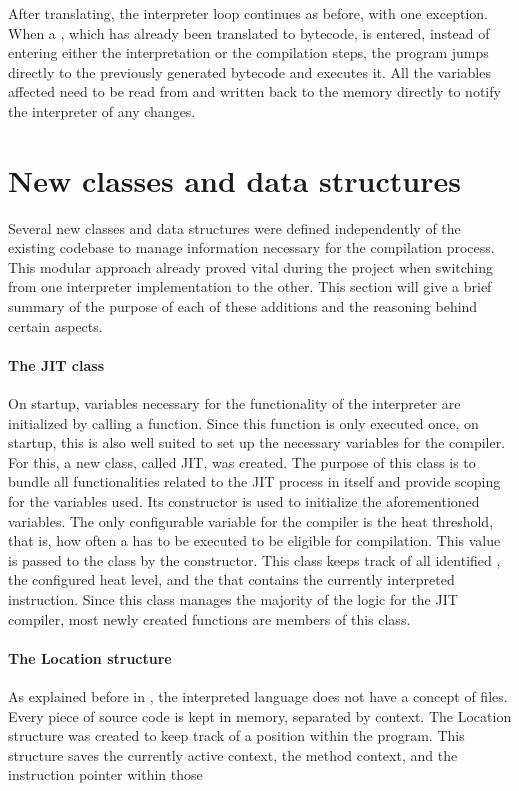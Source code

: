 After translating, the interpreter loop continues as before, with one exception. When a \bb{}, which has already been translated to bytecode, is entered, instead of entering either the interpretation or the compilation steps, the program jumps directly to the previously generated bytecode and executes it. All the variables affected need to be read from and written back to the memory directly to notify the interpreter of any changes.

\section{New classes and data structures}
Several new classes and data structures were defined independently of the existing codebase to manage information necessary for the compilation process. This modular approach already proved vital during the project when switching from one interpreter implementation to the other. This section will give a brief summary of the purpose of each of these additions and the reasoning behind certain aspects.

\paragraph{The JIT class}
On startup, variables necessary for the functionality of the interpreter are initialized by calling a function. Since this function is only executed once, on startup, this is also well suited to set up the necessary variables for the \jit{} compiler. 
For this, a new class, called JIT, was created. The purpose of this class is to bundle all functionalities related to the JIT process in itself and provide scoping for the variables used. Its constructor is used to initialize the aforementioned variables. The only configurable variable for the \jit{} compiler is the heat threshold, that is, how often a \bb{} has to be executed to be eligible for compilation. This value is passed to the class by the constructor.
This class keeps track of all identified \bbs{}, the configured heat level, and the \bb{} that contains the currently interpreted instruction.
Since this class manages the majority of the logic for the JIT compiler, most newly created functions are members of this class. 

\paragraph{The Location structure}
As explained before in , the interpreted language does not have a concept of files. Every piece of source code is kept in memory, separated by context. 
The Location structure was created to keep track of a position within the program. This structure saves the currently active context, the method context, and the instruction pointer within those

